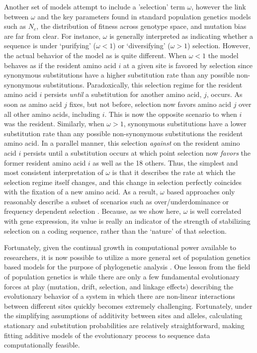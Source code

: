 \documentclass{article}
\newcommand{\Ne}{\ensuremath{{N_e}}\xspace} %
\begin{document}
Another set of models attempt to include a 'selection' term $\omega$, however the link between $\omega$ and the key parameters found in standard population genetics models such as \Ne, the distribution of fitness across genotype space, and mutation bias are far from clear.
For instance, $\omega$ is generally interpreted as indicating whether a sequence is under `purifying' ($\omega < 1$) or `diversifying' ($\omega > 1$) selection.
However, the actual behavior of the model as is quite different.
When $\omega < 1$ the model behaves as if the resident amino acid $i$ at a given site is favored by selection since synonymous substitutions have a higher substitution rate than any possible non-synonymous substitutions.
Paradoxically, this selection regime for the resident amino acid $i$ persists \emph{until} a substitution for another amino acid, $j$, occurs.
As soon as amino acid $j$ fixes, but not before, selection now favors amino acid $j$ over all other amino acids, including $i$.
This is now the opposite scenario to when $i$ was the resident.
Similarly, when $\omega > 1$, synonymous substitutions have a lower substitution rate than any possible non-synonymous substitutions the resident amino acid.
In a parallel manner, this selection \emph{against} on the resident amino acid $i$ persists until a substitution occurs at which point selection now \emph{favors}  the former resident amino acid $i$ as well as the 18 others.
Thus, the simplest and most consistent interpretation of $\omega$ is that it describes the rate at which the selection regime itself changes, and this change in selection perfectly coincides with the fixation of a new amino acid.
As a result, $\omega$ based approaches only reasonably describe a subset of scenarios such as over/underdominance or frequency dependent selection \citep{HughesAndNei1988,Nowak2006}.
Because, as we show here, $\omega$ is well correlated with gene expression, its value is really an indicator of the strength of stabilizing selection on a coding sequence, rather than the `nature' of that selection.

Fortunately, given the continual growth in computational power available to researchers, it is now possible to utilize a more general set of population genetics based models for the purpose of phylogenetic analysis \citep[e.g.][]{HalpernAndBruno1998,RobinsonEtAl2003,LartillotAndPhilippe2004,RodrigueAndLartillot2014}.
One lesson from the field of population genetics is while there are only a few fundamental evolutionary forces at play (mutation, drift, selection, and linkage effects) describing the evolutionary behavior of a system in which there are non-linear interactions between different sites quickly becomes extremely challenging.
Fortunately, under the simplifying assumptions of additivity between sites and alleles, calculating stationary and substitution probabilities are relatively straightforward, making fitting additive models of the evolutionary process to sequence data computationally feasible.
\end{document}
